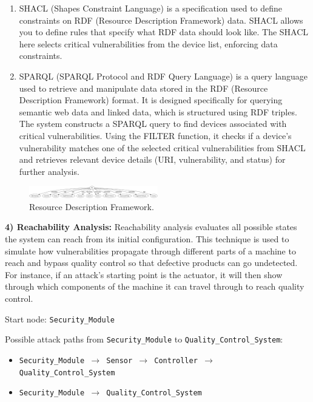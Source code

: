 \documentclass[conference]{IEEEtran}
\begin{document}
\begin{enumerate}
    \item SHACL (Shapes Constraint Language) is a specification used to define constraints on RDF (Resource Description Framework) data. SHACL allows you to define rules that specify what RDF data should look like. The SHACL here selects critical vulnerabilities from the device list, enforcing data constraints.
    \item SPARQL (SPARQL Protocol and RDF Query Language) is a query language used to retrieve and manipulate data stored in the RDF (Resource Description Framework) format. It is designed specifically for querying semantic web data and linked data, which is structured using RDF triples. The system constructs a SPARQL query to find devices associated with critical vulnerabilities. Using the FILTER function, it checks if a device's vulnerability matches one of the selected critical vulnerabilities from SHACL and retrieves relevant device details (URI, vulnerability, and status) for further analysis.
\end{enumerate}

\begin{figure}[h!]
    \centering
    \includegraphics[width=0.5\textwidth]{rdf.png} 
    \caption{Resource Description Framework.}
    \label{fig:myimage}
\end{figure}

\textbf{4) Reachability Analysis:} Reachability analysis evaluates all possible states the system can reach from its initial configuration. This technique is used to simulate how vulnerabilities propagate through different parts of a machine to reach and bypass quality control so that defective products can go undetected. For instance, if an attack's starting point is the actuator, it will then show through which components of the machine it can travel through to reach quality control.

Start node: \texttt{Security\_Module}

Possible attack paths from \texttt{Security\_Module} to \texttt{Quality\_Control\_System}:
\begin{itemize}
    \item \texttt{Security\_Module $\rightarrow$ Sensor $\rightarrow$ Controller $\rightarrow$ Quality\_Control\_System}
    \item \texttt{Security\_Module $\rightarrow$ Quality\_Control\_System}
\end{itemize}
\end{document}
